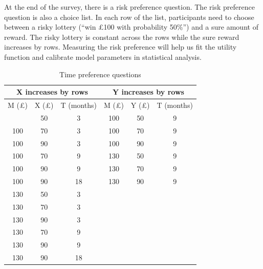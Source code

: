 \documentclass[
  12pt,
]{article}
\begin{document}
At the end of the survey, there is a risk preference question. The risk
preference question is also a choice list. In each row of the list,
participants need to choose between a risky lottery (``win £100 with
probability 50\%'') and a sure amount of reward. The risky lottery is
constant across the rows while the sure reward increases by rows.
Measuring the risk preference will help us fit the utility function and
calibrate model parameters in statistical analysis.

\begin{longtable}{@{}ccc|ccc@{}}
\caption{Time preference questions}
\label{tab:design-variable}\\
\toprule
\multicolumn{3}{c}{X increases by rows} & \multicolumn{3}{c}{Y increases by rows} \\
\midrule
M (£) & X (£) & T (months) & M (£) & Y (£) & T (months) \\
\midrule
\endhead
\bottomrule
\endfoot
\endlastfoot
100 & 50 & 3 & 100 & 50 & 9 \\
100 & 70 & 3 & 100 & 70 & 9 \\
100 & 90 & 3 & 100 & 90 & 9 \\
100 & 70 & 9 & 130 & 50 & 9 \\
100 & 90 & 9 & 130 & 70 & 9 \\
100 & 90 & 18 & 130 & 90 & 9 \\
130 & 50 & 3 & \multicolumn{1}{c}{} & \multicolumn{1}{c}{} & \multicolumn{1}{c}{} \\
130 & 70 & 3 & \multicolumn{1}{c}{} & \multicolumn{1}{c}{} & \multicolumn{1}{c}{} \\
130 & 90 & 3 & \multicolumn{1}{c}{} & \multicolumn{1}{c}{} & \multicolumn{1}{c}{} \\
130 & 70 & 9 & \multicolumn{1}{c}{} & \multicolumn{1}{c}{} & \multicolumn{1}{c}{} \\
130 & 90 & 9 & \multicolumn{1}{c}{} & \multicolumn{1}{c}{} & \multicolumn{1}{c}{} \\
130 & 90 & 18 & \multicolumn{1}{c}{} & \multicolumn{1}{c}{} & \multicolumn{1}{c}{} \\
\bottomrule
\end{longtable}
\end{document}

